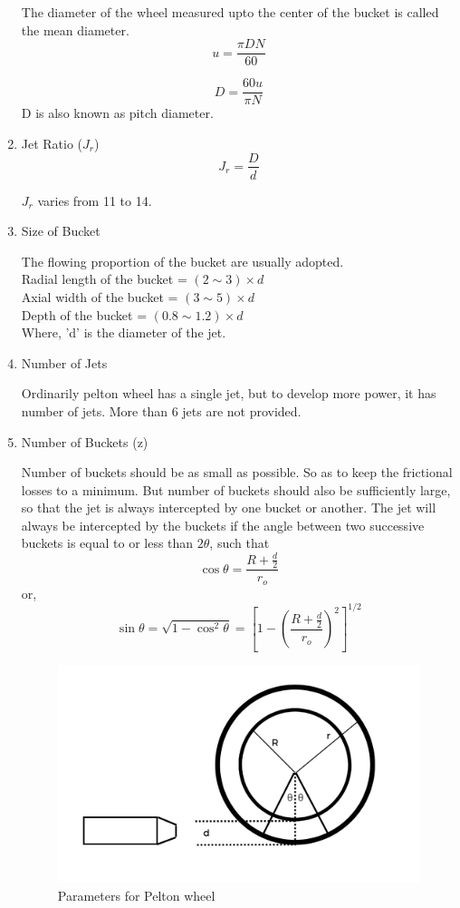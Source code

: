 \documentclass{article}
\begin{document}
\begin{enumerate}
The diameter of the wheel measured upto the center of the bucket is called the mean diameter. 
$$u = \frac{\pi D N}{60}$$

\begin{equation}
  D = \frac{60 u}{\pi N}
\end{equation}
D is also known as pitch diameter. 

\item Jet Ratio ($J_r$)
\begin{equation}
  J_r = \frac{D}{d} 
\end{equation}

$J_r$ varies from 11 to 14. 

\item Size of Bucket 

The flowing proportion of the bucket are usually adopted. \\
Radial length of the bucket = $(2 \sim 3) \times d $\\
Axial width of the bucket = $(3 \sim 5) \times d $ \\
Depth of the bucket = $(0.8 \sim 1.2) \times d $ \\
Where, 'd' is the diameter of the jet. 

\item Number of Jets

Ordinarily pelton wheel has a single jet, but to develop more power, it has number of jets. More than 6 jets are not provided. 

\item Number of Buckets (z)

Number of buckets should be as small as possible. So as to keep the frictional losses to a minimum. But number of buckets should also be sufficiently large, so that the jet is always intercepted by one bucket or another. The jet will always be intercepted by the buckets if the angle between two successive buckets is equal to or less than $2\theta$, such that $$\cos \theta = \frac{R+\frac{d}{2}}{r_o}$$
or, $$\sin \theta = \sqrt{1 - \cos^2 \theta} = \left[1- \left(\frac{R + \frac{d}{2}}{r_o}\right)^2\right]^{1/2} $$

\begin{figure}[h]
  \begin{center}
    \includegraphics[width=0.9\linewidth]{img/number_of_bucket.png}
    \caption{Parameters for Pelton wheel}
  \end{center}
\end{figure} 


\end{enumerate}
\end{document}
